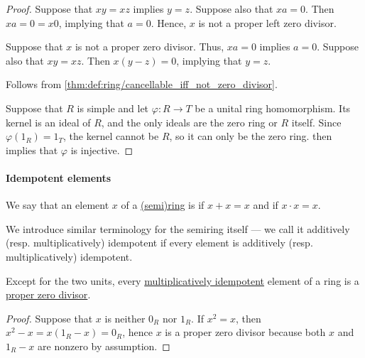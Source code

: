 \begin{proof}
  \SufficiencySubProof* Suppose that \( xy = xz \) implies \( y = z \). Suppose also that \( xa = 0 \). Then \( xa = 0 = x0 \), implying that \( a = 0 \). Hence, \( x \) is not a proper left zero divisor.

  \NecessitySubProof* Suppose that \( x \) is not a proper zero divisor. Thus, \( xa = 0 \) implies \( a = 0 \). Suppose also that \( xy = xz \). Then \( x(y - z) = 0 \), implying that \( y = z \).

   Follows from \cref{thm:def:ring/cancellable_iff_not_zero_divisor}.

   Suppose that \( R \) is simple and let \( \varphi: R \to T \) be a unital ring homomorphism. Its kernel is an ideal of \( R \), and the only ideals are the zero ring or \( R \) itself. Since \( \varphi(1_R) = 1_T \), the kernel cannot be \( R \), so it can only be the zero ring.  then implies that \( \varphi \) is injective.
\end{proof}

\paragraph{Idempotent elements}

\begin{definition}\label{def:semiring_idempotent}
  We say that an element \( x \) of a \hyperref[def:semiring]{(semi)ring} is  if \( x + x = x \) and  if \( x \cdot x = x \).

  We introduce similar terminology for the semiring itself --- we call it additively (resp. multiplicatively) idempotent if every element is additively (resp. multiplicatively) idempotent.
\end{definition}

\begin{proposition}\label{thm:idempotent_division}
  Except for the two units, every \hyperref[def:semiring_idempotent]{multiplicatively idempotent} element of a ring is a \hyperref[def:semiring_divisibility/zero]{proper zero divisor}.
\end{proposition}
\begin{proof}
  Suppose that \( x \) is neither \( 0_R \) nor \( 1_R \). If \( x^2 = x \), then \( x^2 - x = x(1_R - x) = 0_R \), hence \( x \) is a proper zero divisor because both \( x \) and \( 1_R - x \) are nonzero by assumption.
\end{proof}

